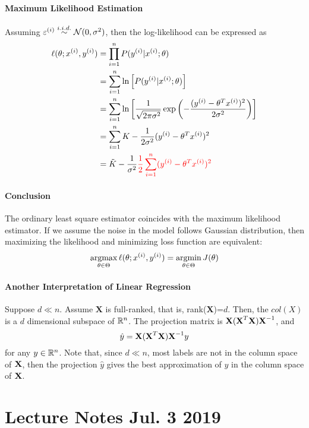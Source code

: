 \documentclass{report}
\newcommand{\upi}[0]{^{(i)}}
\begin{document}
        \paragraph{Maximum Likelihood Estimation} Assuming $\varepsilon\upi \stackrel{i.i.d.}{\sim} \mc{N}(0, \sigma^2)$, then the log-likelihood can be expressed as 
        \begin{align}
            \ell(\theta; x\upi, y\upi) &= \prod_{i=1}^n P(y\upi|x\upi; \theta)\\
            &= \sum_{i=1}^n \ln \left[P(y\upi|x\upi; \theta) \right]\\
            &= \sum_{i=1}^n \ln \left[ \frac{1}{\sqrt{2\pi \sigma^2}} \exp\left(
                -\frac{(y^{(i)} - \theta^T x^{(i)})^2}{2 \sigma^2}
            \right) \right] \\
            &= \sum_{i=1}^n K - \frac{1}{2 \sigma^2}(y^{(i)} - \theta^T x^{(i)})^2 \\
            &= \tilde{K} - \frac{1}{\sigma^2} \red{
                \frac{1}{2} \sum_{i=1}^n (y^{(i)} - \theta^T x^{(i)})^2
            }
        \end{align}
        
        \paragraph{Conclusion} The ordinary least square estimator coincides with the maximum likelihood estimator. If we assume the noise in the model follows Gaussian distribution, then maximizing the likelihood and minimizing loss function are equivalent:
        \begin{align}
            \argmax_{\theta \in \Theta} \ell(\theta; x\upi, y\upi) = \argmin_{\theta \in \Theta} J(\theta)
        \end{align}
        
        \paragraph{Another Interpretation of Linear Regression} Suppose $d \ll n$. Assume $\textbf{X}$ is full-ranked, that is, rank(\textbf{X})=$d$. Then, the $col(X)$ is a $d$ dimensional subspace of $\mathbb{R}^n$. The projection matrix is $\textbf{X} (\textbf{X}^T \textbf{X})\textbf{X}^{-1}$, and 
        \begin{equation}
        	\hat{y} = \textbf{X} (\textbf{X}^T \textbf{X})\textbf{X}^{-1} y
        \end{equation}
        for any $y \in \mathbb{R}^n$. Note that, since $d \ll n$, most labels are not in the column space of $\textbf{X}$, then the projection $\hat{y}$ gives the best approximation of $y$ in the column space of $\textbf{X}$.
        
        \section{Lecture Notes Jul. 3 2019}
\end{document}
